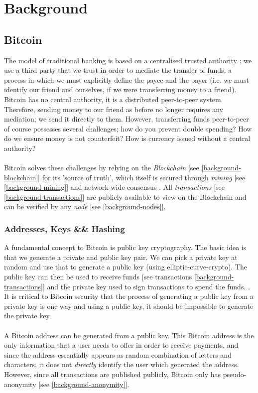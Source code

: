 \chapter{Background}

\section{Bitcoin}
The model of traditional banking is based on a centralised trusted authority \cite{RefWorks:doc:5c39e80ae4b0854ae611b047}; we use a third party that we trust in order to mediate the transfer of funds, a process in which we must explicitly define the payee and the payer (i.e. we must identify our friend and ourselves, if we were transferring money to a friend). Bitcoin has no central authority, it is a distributed peer-to-peer system. Therefore, sending money to our friend as before no longer requires any mediation; we send it directly to them. However, transferring funds peer-to-peer of course possesses several challenges; how do you prevent double spending? How do we ensure money is not counterfeit? \cite{RefWorks:doc:5c39e80ae4b0854ae611b047} How is currency issued without a central authority? 
\\\\
Bitcoin solves these challenges by relying on the \textit{Blockchain} [see \ref{background-blockchain}] for its 'source of truth', which itself is secured through \textit{mining} [see \ref{background-mining}] and network-wide consensus \cite{RefWorks:doc:5c39e80ae4b0854ae611b047}. All \textit{transactions} [see \ref{background-transactions}] are publicly available to view on the Blockchain and can be verified by any \textit{node} [see \ref{background-nodes}]. 

\subsection{Addresses, Keys &\& Hashing}
A fundamental concept to Bitcoin is public key cryptography. The basic idea is that we generate a private and public key pair. We can pick a private key at random and use that to generate a public key (using \gls{elliptic-curve-crypto}). The public key can then be used to receive funds [see transactions \ref{background-transactions}] and the private key used to sign transactions to spend the funds. \cite{RefWorks:doc:5c39e80ae4b0854ae611b047}. It is critical to Bitcoin security that the process of generating a public key from a private key is one way and using a public key, it should be impossible to generate the private key. 
\\\\
A Bitcoin address can be generated from a public key. This Bitcoin address is the only information that a user needs to offer in order to receive payments, and since the address essentially appears as random combination of letters and characters, it does not \textit{directly} identify the user which generated the address. However, since all transactions are published publicly, Bitcoin only has pseudo-anonymity [see \ref{background-anonymity}].

